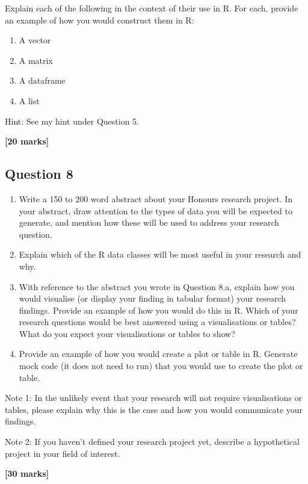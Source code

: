 \documentclass[
  10t,
]{article}
\providecommand{\tightlist}{%
  \setlength{\itemsep}{0pt}\setlength{\parskip}{0pt}}\usepackage{longtable,booktabs,array}
\begin{document}
Explain each of the following in the context of their use in R. For
each, provide an example of how you would construct them in R:

\begin{enumerate}
\def\labelenumi{\alph{enumi}.}
\tightlist
\item
  A vector
\item
  A matrix
\item
  A dataframe
\item
  A list
\end{enumerate}

Hint: See my hint under Question 5.

\textbf{{[}20 marks{]}}

\subsection{Question 8}\label{question-8}

\begin{enumerate}
\def\labelenumi{\alph{enumi}.}
\item
  Write a 150 to 200 word abstract about your Honours research project.
  In your abstract, draw attention to the types of data you will be
  expected to generate, and mention how these will be used to address
  your research question.
\item
  Explain which of the R data classes will be most useful in your
  research and why.
\item
  With reference to the abstract you wrote in Question 8.a, explain how
  you would visualise (or display your finding in tabular format) your
  research findings. Provide an example of how you would do this in R.
  Which of your research questions would be best answered using a
  visualisations or tables? What do you expect your visualisations or
  tables to show?
\item
  Provide an example of how you would create a plot or table in R.
  Generate mock code (it does not need to run) that you would use to
  create the plot or table.
\end{enumerate}

Note 1: In the unlikely event that your research will not require
visualisations or tables, please explain why this is the case and how
you would communicate your findings.

Note 2: If you haven't defined your research project yet, describe a
hypothetical project in your field of interest.

\textbf{{[}30 marks{]}}
\end{document}

